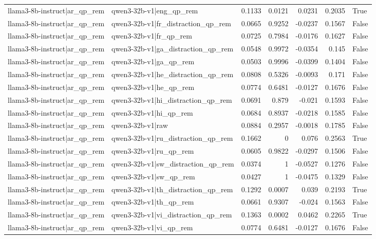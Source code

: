 \begin{table}
\begin{tabular}{l l r r r r l}
llama3-8b-instruct|ar_qp_rem & qwen3-32b-v1|eng_qp_rem & 0.1133 & 0.0121 & 0.0231 & 0.2035 & True \\
llama3-8b-instruct|ar_qp_rem & qwen3-32b-v1|fr_distraction_qp_rem & 0.0665 & 0.9252 & -0.0237 & 0.1567 & False \\
llama3-8b-instruct|ar_qp_rem & qwen3-32b-v1|fr_qp_rem & 0.0725 & 0.7984 & -0.0176 & 0.1627 & False \\
llama3-8b-instruct|ar_qp_rem & qwen3-32b-v1|ga_distraction_qp_rem & 0.0548 & 0.9972 & -0.0354 & 0.145 & False \\
llama3-8b-instruct|ar_qp_rem & qwen3-32b-v1|ga_qp_rem & 0.0503 & 0.9996 & -0.0399 & 0.1404 & False \\
llama3-8b-instruct|ar_qp_rem & qwen3-32b-v1|he_distraction_qp_rem & 0.0808 & 0.5326 & -0.0093 & 0.171 & False \\
llama3-8b-instruct|ar_qp_rem & qwen3-32b-v1|he_qp_rem & 0.0774 & 0.6481 & -0.0127 & 0.1676 & False \\
llama3-8b-instruct|ar_qp_rem & qwen3-32b-v1|hi_distraction_qp_rem & 0.0691 & 0.879 & -0.021 & 0.1593 & False \\
llama3-8b-instruct|ar_qp_rem & qwen3-32b-v1|hi_qp_rem & 0.0684 & 0.8937 & -0.0218 & 0.1585 & False \\
llama3-8b-instruct|ar_qp_rem & qwen3-32b-v1|raw & 0.0884 & 0.2957 & -0.0018 & 0.1785 & False \\
llama3-8b-instruct|ar_qp_rem & qwen3-32b-v1|ru_distraction_qp_rem & 0.1662 & 0 & 0.076 & 0.2563 & True \\
llama3-8b-instruct|ar_qp_rem & qwen3-32b-v1|ru_qp_rem & 0.0605 & 0.9822 & -0.0297 & 0.1506 & False \\
llama3-8b-instruct|ar_qp_rem & qwen3-32b-v1|sw_distraction_qp_rem & 0.0374 & 1 & -0.0527 & 0.1276 & False \\
llama3-8b-instruct|ar_qp_rem & qwen3-32b-v1|sw_qp_rem & 0.0427 & 1 & -0.0475 & 0.1329 & False \\
llama3-8b-instruct|ar_qp_rem & qwen3-32b-v1|th_distraction_qp_rem & 0.1292 & 0.0007 & 0.039 & 0.2193 & True \\
llama3-8b-instruct|ar_qp_rem & qwen3-32b-v1|th_qp_rem & 0.0661 & 0.9307 & -0.024 & 0.1563 & False \\
llama3-8b-instruct|ar_qp_rem & qwen3-32b-v1|vi_distraction_qp_rem & 0.1363 & 0.0002 & 0.0462 & 0.2265 & True \\
llama3-8b-instruct|ar_qp_rem & qwen3-32b-v1|vi_qp_rem & 0.0774 & 0.6481 & -0.0127 & 0.1676 & False \\

\end{tabular}
\end{table}
